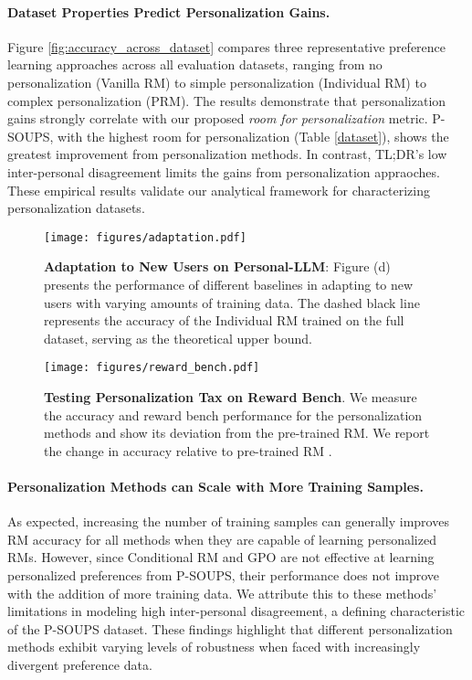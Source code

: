 \paragraph{Dataset Properties Predict Personalization Gains.} Figure \ref{fig:accuracy_across_dataset} compares three representative preference learning approaches across all evaluation datasets, ranging from no personalization (Vanilla RM) to simple personalization (Individual RM) to complex personalization (PRM). The results demonstrate that personalization gains strongly correlate with our proposed \textit{room for personalization} metric. P-SOUPS, with the highest room for personalization (Table \ref{dataset}), shows the greatest improvement from personalization methods.
In contrast, TL;DR's low inter-personal disagreement limits the gains from personalization appraoches.
These empirical results validate our analytical framework for characterizing personalization datasets.


\begin{figure}[!h]
\centering
\texttt{[image: figures/adaptation.pdf]}
\vspace{-0.2cm}
\caption{\textbf{Adaptation to New Users on Personal-LLM}: Figure (d) presents the performance of different baselines in adapting to new users with varying amounts of training data. The dashed black line represents the accuracy of the Individual RM trained on the full dataset, serving as the theoretical upper bound.}
\label{adaptation}
\vspace{-0.5cm}
\end{figure}


\begin{figure*}[]
\centering
\vspace{-0.3cm}
\texttt{[image: figures/reward\_bench.pdf]}
\vspace{-1cm}
\caption{\textbf{Testing Personalization Tax on Reward Bench}. We measure the accuracy and reward bench performance for the personalization methods and show its deviation from the pre-trained RM. We report the change in accuracy relative to pre-trained RM \cite{dong2023raft}. %
}
\label{personalization_tax}
\vspace{-0.3cm}
\end{figure*}

\paragraph{Personalization Methods can Scale with More Training Samples.} 
As expected, increasing the number of training samples can generally improves RM accuracy for all methods when they are capable of learning personalized RMs. 
However, since Conditional RM and GPO are not effective at learning personalized preferences from P-SOUPS, their performance does not improve with the addition of more training data.
We attribute this to these methods' limitations in modeling high inter-personal disagreement, a defining characteristic of the P-SOUPS dataset. 
These findings highlight that different personalization methods exhibit varying levels of robustness when faced with increasingly divergent preference data.




